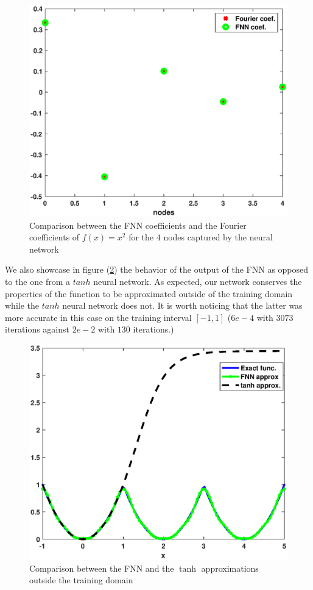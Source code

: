 \documentclass[AMS,STIX1COL]{WileyNJD-v2}
\begin{document}
  \begin{figure}[!htb]
    \centering
    \includegraphics[width=.8\textwidth]{fnncoeffvsfourcoef.eps}
    \caption{Comparison between the FNN coefficients and the Fourier coefficients of $f(x) = x^2$ for the $4$ nodes captured by the neural network}
    \label{Fnnx2}
\end{figure}
We also showcase in figure (\ref{Fnnx2out}) the behavior of the output of the FNN as opposed to the one from a $tanh$ neural network. As expected, our network conserves the  properties of the function to be approximated outside of the training domain while the $tanh$ neural network does not. It is worth noticing that the latter was more accurate in this case on the training interval $[-1, 1]$ ($6e-4$ with $3073$ iterations against $2e-2$ with $130$ iterations.)
\begin{figure}[!htb]
    \centering
    \includegraphics[width=.8\textwidth]{fnnvstanhoutx2.eps}
    \caption{Comparison between the FNN and the $\tanh$ approximations outside the training domain}
    \label{Fnnx2out}
\end{figure}
\end{document}
